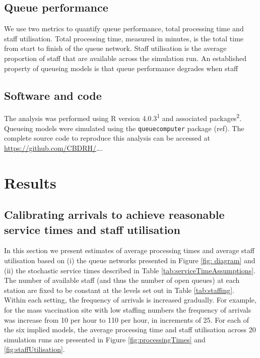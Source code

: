 \documentclass{article}
\begin{document}
\hypertarget{queue-performance}{%
\subsection{Queue performance}\label{queue-performance}}

We use two metrics to quantify queue performance, total processing time
and staff utilisation. Total processing time, measured in minutes, is
the total time from start to finish of the queue network. Staff
utilisation is the average proportion of staff that are available across
the simulation run. An established property of queueing models is that
queue performance degrades when staff

\hypertarget{software-and-code}{%
\subsection{Software and code}\label{software-and-code}}

The analysis was performed using R version 4.0.3\textsuperscript{1} and
associated packages\textsuperscript{2}. Queueing models were simulated
using the \texttt{queuecomputer} package (ref). The complete source code
to reproduce this analysis can be accessed at
\url{https://github.com/CBDRH/}\ldots.

\hypertarget{results}{%
\section{Results}\label{results}}

\hypertarget{calibrating-arrivals-to-achieve-reasonable-service-times-and-staff-utilisation}{%
\subsection{Calibrating arrivals to achieve reasonable service times and
staff
utilisation}\label{calibrating-arrivals-to-achieve-reasonable-service-times-and-staff-utilisation}}

In this section we present estimates of average processing times and
average staff utilisation based on (i) the queue networks presented in
Figure \ref{fig: diagram} and (ii) the stochastic service times
described in Table \ref{tab:serviceTimeAssumptions}. The number of
available staff (and thus the number of open queues) at each station are
fixed to be constant at the levels set out in Table \ref{tab:staffing}.
Within each setting, the frequency of arrivals is increased gradually.
For example, for the mass vaccination site with low staffing numbers the
frequency of arrivals was increase from 10 per hour to 110 per hour, in
increments of 25. For each of the six implied models, the average
processing time and staff utilisation across 20 simulation runs are
presented in Figure \ref{fig:processingTimes} and
\ref{fig:staffUtilisation}.
\end{document}
